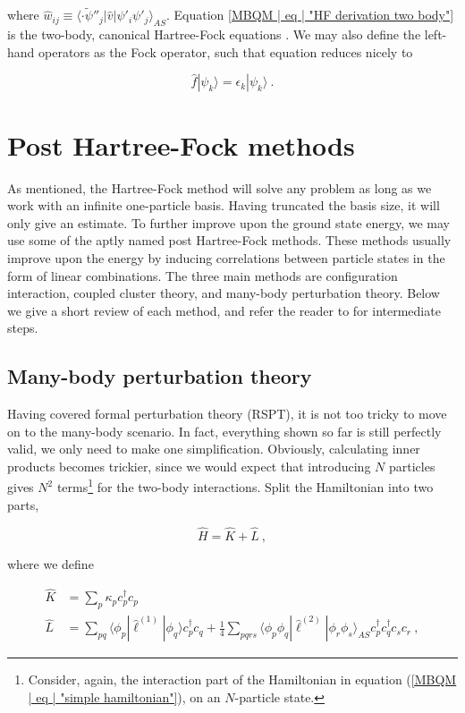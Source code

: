 \documentclass[10pt,twoside]{report}
\begin{document}
	\noindent where $\hat{w}_{ij}\equiv \langle\cdot\widetilde{\psi}''_j|\hat{v}|\psi'_i\psi'_j\rangle_{AS}$. Equation \ref{MBQM | eq | "HF derivation two body"} is the two-body, canonical Hartree-Fock equations \cite{Kvaal15}. We may also define the left-hand operators as the Fock operator, such that equation reduces nicely to
	
	\begin{equation}
		\hat{f}|\psi_k\rangle = \epsilon_k|\psi_k\rangle \:.
	\end{equation}
	
	\section{Post Hartree-Fock methods}
	As mentioned, the Hartree-Fock method will solve any problem as long as we work with an infinite one-particle basis. Having truncated the basis size, it will only give an estimate. To further improve upon the ground state energy, we may use some of the aptly named post Hartree-Fock methods. These methods usually improve upon the energy by inducing correlations between particle states in the form of linear combinations. The three main methods are configuration interaction, coupled cluster theory, and many-body perturbation theory. Below we give a short review of each method, and refer the reader to \cite{ShavittBartlett09} for intermediate steps.
	
	\subsection{Many-body perturbation theory}
	Having covered formal perturbation theory (RSPT), it is not too tricky to move on to the many-body scenario. In fact, everything shown so far is still perfectly valid, we only need to make one simplification. Obviously, calculating inner products becomes trickier, since we would expect that introducing $N$ particles gives $N^2$ terms\footnote{Consider, again, the interaction part of the Hamiltonian in equation (\ref{MBQM | eq | "simple hamiltonian"}), on an $N$-particle state.} for the two-body interactions.  Split the Hamiltonian into two parts,
	
	\begin{equation}
		\hat{H} = \hat{K} + \hat{L}\:,
	\end{equation}
	
	\noindent where we define
	
	\begin{align}
		\hat{K} &= \sum_p \kappa_p c_p^\dagger c_p \label{MBQM | eq | "one-body K"}\\
		\hat{L} &=  \sum_{pq} \langle\phi_p|\hat{\ell}^{(1)}|\phi_q\rangle c_p^\dagger c_q + \frac{1}{4}\sum_{pqrs} \langle\phi_p\phi_q|\hat{\ell}^{(2)}|\phi_r\phi_s\rangle_{AS} c_p^\dagger c_q^\dagger c_s c_r\:,
	\end{align}
	
\end{document}
